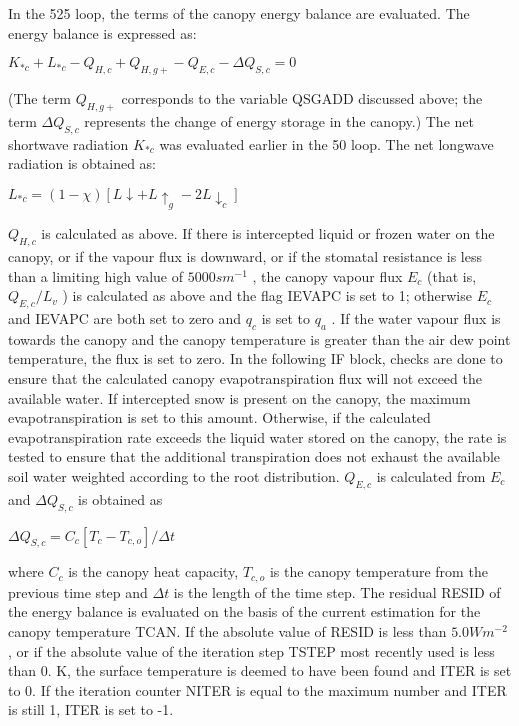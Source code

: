 In the 525 loop, the terms of the canopy energy balance are evaluated. The energy balance is expressed as\+:

$K_{*c} + L_{*c} - Q_{H,c} + Q_{H,g+} - Q_{E,c} - \Delta Q_{S,c} = 0$

(The term $Q_{H,g+}$ corresponds to the variable Q\+S\+G\+A\+D\+D discussed above; the term $\Delta Q_{S,c}$ represents the change of energy storage in the canopy.) The net shortwave radiation $K_{*c}$ was evaluated earlier in the 50 loop. The net longwave radiation is obtained as\+:

$L_{*c} = (1 - \chi) [L \downarrow + L \uparrow_g - 2 L \downarrow_c ]$

$Q_{H,c}$ is calculated as above. If there is intercepted liquid or frozen water on the canopy, or if the vapour flux is downward, or if the stomatal resistance is less than a limiting high value of $5000 s m^{-1}$ , the canopy vapour flux $E_c$ (that is, $Q_{E,c} /L_v$ ) is calculated as above and the flag I\+E\+V\+A\+P\+C is set to 1; otherwise $E_c$ and I\+E\+V\+A\+P\+C are both set to zero and $q_c$ is set to $q_a$ . If the water vapour flux is towards the canopy and the canopy temperature is greater than the air dew point temperature, the flux is set to zero. In the following I\+F block, checks are done to ensure that the calculated canopy evapotranspiration flux will not exceed the available water. If intercepted snow is present on the canopy, the maximum evapotranspiration is set to this amount. Otherwise, if the calculated evapotranspiration rate exceeds the liquid water stored on the canopy, the rate is tested to ensure that the additional transpiration does not exhaust the available soil water weighted according to the root distribution. $Q_{E,c}$ is calculated from $E_c$ and $\Delta Q_{S,c}$ is obtained as

$\Delta Q_{S,c} = C_c [T_c - T_{c,o} ]/ \Delta t$

where $C_c$ is the canopy heat capacity, $T_{c,o}$ is the canopy temperature from the previous time step and $\Delta t$ is the length of the time step. The residual R\+E\+S\+I\+D of the energy balance is evaluated on the basis of the current estimation for the canopy temperature T\+C\+A\+N. If the absolute value of R\+E\+S\+I\+D is less than $5.0 W m^{-2}$ , or if the absolute value of the iteration step T\+S\+T\+E\+P most recently used is less than 0. K, the surface temperature is deemed to have been found and I\+T\+E\+R is set to 0. If the iteration counter N\+I\+T\+E\+R is equal to the maximum number and I\+T\+E\+R is still 1, I\+T\+E\+R is set to -\/1.


